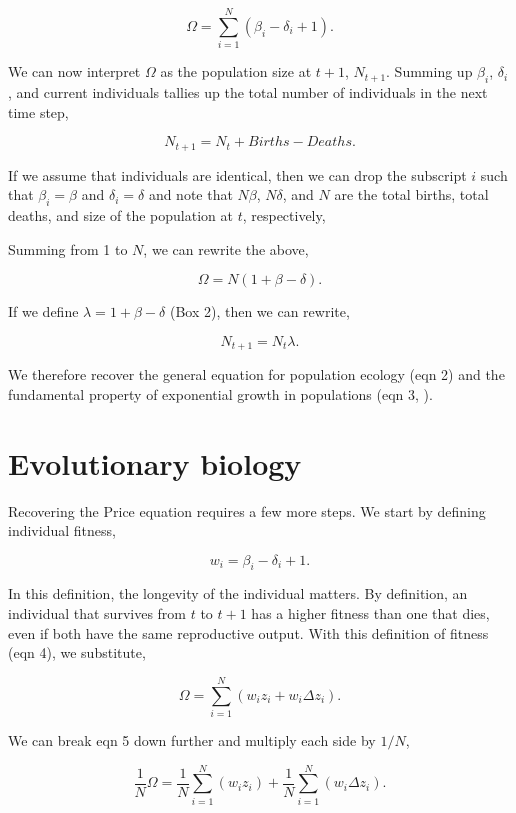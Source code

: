 \documentclass[
]{article}
\begin{document}
\[\Omega = \sum_{i=1}^{N} \left(\beta_{i} - \delta_{i} + 1 \right).\]

We can now interpret \(\Omega\) as the population size at \(t+1\),
\(N_{t+1}\). Summing up \(\beta_{i}\), \(\delta_{i}\), and current
individuals tallies up the total number of individuals in the next time
step,

\[N_{t+1} = N_{t} + Births - Deaths.
\tag{2}
\]

If we assume that individuals are identical, then we can drop the
subscript \(i\) such that \(\beta_{i} = \beta\) and
\(\delta_{i} = \delta\) and note that \(N\beta\), \(N\delta\), and \(N\)
are the total births, total deaths, and size of the population at \(t\),
respectively,

Summing from 1 to \(N\), we can rewrite the above,

\[\Omega = N\left(1 + \beta - \delta \right).\]

If we define \(\lambda = 1 + \beta - \delta\) (Box 2), then we can
rewrite,

\[N_{t+1} = N_{t}\lambda.
\tag{3}
\]

We therefore recover the general equation for population ecology (eqn 2)
and the fundamental property of exponential growth in populations (eqn
3, ).

\section{Evolutionary biology}\label{evolutionary-biology}

Recovering the Price equation requires a few more steps. We start by
defining individual fitness,

\[w_{i} = \beta_{i} - \delta_{i} + 1.
\tag{4}
\]

In this definition, the longevity of the individual matters. By
definition, an individual that survives from \(t\) to \(t + 1\) has a
higher fitness than one that dies, even if both have the same
reproductive output. With this definition of fitness (eqn 4), we
substitute,

\[\Omega = \sum_{i=1}^{N} \left(w_{i}z_{i} + w_{i}\Delta z_{i} \right).
\tag{5}
\]

We can break eqn 5 down further and multiply each side by \(1/N\),

\[\frac{1}{N}\Omega = \frac{1}{N}\sum_{i=1}^{N} \left(w_{i}z_{i} \right) + \frac{1}{N}\sum_{i=1}^{N}\left( w_{i}\Delta z_{i} \right).
\tag{6}
\]
\end{document}
